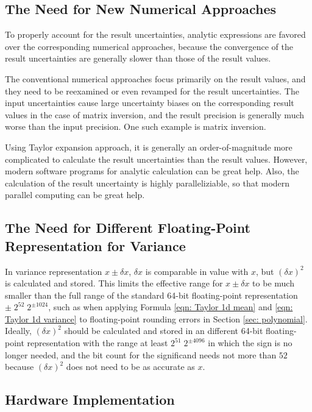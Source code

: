 \documentclass[twoside]{article}
\numberwithin{equation}{section}
\begin{document}
\subsection{The Need for New Numerical Approaches}

To properly account for the result uncertainties, analytic expressions are favored over the corresponding numerical approaches, because the convergence of the result uncertainties are generally slower than those of the result values.

The conventional numerical approaches focus primarily on the result values, and they need to be reexamined or even revamped for the result uncertainties.
The input uncertainties cause large uncertainty biases on the corresponding result values in the case of matrix inversion,  and the result precision is generally much worse than the input precision.
One such example is matrix inversion.

Using Taylor expansion approach, it is generally an order-of-magnitude more complicated to calculate the result uncertainties than the result values.
However, modern software programs for analytic calculation can be great help.
Also, the calculation of the result uncertainty is highly paralleliziable, so that modern parallel computing can be great help. 


\subsection{The Need for Different Floating-Point Representation for Variance}

In variance representation $x \pm \delta x$, $\delta x$ is comparable in value with $x$, but $(\delta x)^2$ is calculated and stored.
This limits the effective range for $x \pm \delta x$ to be much smaller than the full range of the standard 64-bit floating-point representation $\pm\; 2^{52} \; 2^{\pm 1024}$, such as when applying Formula \eqref{eqn: Taylor 1d mean} and \eqref{eqn: Taylor 1d variance} to floating-point rounding errors in Section \ref{sec: polynomial}.
Ideally, $(\delta x)^2$ should be calculated and stored in an different 64-bit floating-point representation with the range at least $2^{51} \; 2^{\pm 4096}$ in which  the sign is no longer needed, and the bit count for the significand needs not more than $52$ because $(\delta x)^2$ does not need to be as accurate as $x$.


\subsection{Hardware Implementation}
\end{document}
